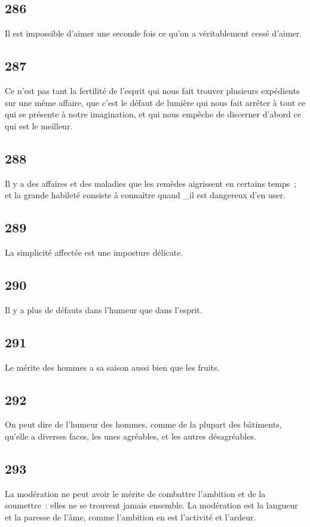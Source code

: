 \documentclass[french,twoside]{book} %
\begin{document}
\subsection[{286}]{ \textsc{286} }
\noindent Il est impossible d’aimer une seconde fois ce qu’on a véritablement cessé d’aimer.
\subsection[{287}]{ \textsc{287} }
\noindent Ce n’est pas tant la fertilité de l’esprit qui nous fait trouver plusieurs expédients sur une même affaire, que c’est le défaut de lumière qui nous fait arrêter à tout ce qui se présente à notre imagination, et qui nous empêche de discerner d’abord ce qui est le meilleur.
\subsection[{288}]{ \textsc{288} }
\noindent Il y a des affaires et des maladies que les remèdes aigrissent en certains temps ; et la grande habileté consiste à connaître quand \_il est dangereux d’en user.
\subsection[{289}]{ \textsc{289} }
\noindent La simplicité affectée est une imposture délicate.
\subsection[{290}]{ \textsc{290} }
\noindent Il y a plus de défauts dans l’humeur que dans l’esprit.
\subsection[{291}]{ \textsc{291} }
\noindent Le mérite des hommes a sa saison aussi bien que les fruits.
\subsection[{292}]{ \textsc{292} }
\noindent On peut dire de l’humeur des hommes, comme de la plupart des bâtiments, qu’elle a diverses faces, les unes agréables, et les autres désagréables.
\subsection[{293}]{ \textsc{293} }
\noindent La modération ne peut avoir le mérite de combattre l’ambition et de la soumettre : elles ne se trouvent jamais ensemble. La modération est la langueur et la paresse de l’âme, comme l’ambition en est l’activité et l’ardeur.
\end{document}
